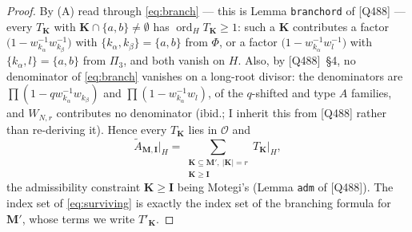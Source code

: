 \documentclass[11pt]{article}
\theoremstyle{plain}
\theoremstyle{definition}
\theoremstyle{remark}
\theoremstyle{plain}
\newcommand{\bI}{\mathbf{I}}
\newcommand{\bM}{\mathbf{M}}
\newcommand{\bK}{\mathbf{K}}
\newcommand{\At}{\widetilde{A}}
\newcommand{\ord}{\operatorname{ord}}
\begin{document}
\begin{proof}
By (A) read through \eqref{eq:branch} --- this is Lemma \texttt{branchord} of
[Q488] --- every $T_{\bK}$ with $\bK\cap\{a,b\}\ne\emptyset$ has
$\ord_HT_{\bK}\ge1$: such a $\bK$ contributes a factor
$\bigl(1-w_{k_\alpha}^{-1}w_{k_\beta}^{-1}\bigr)$ with $\{k_\alpha,k_\beta\}
=\{a,b\}$ from $\Phi$, or a factor $\bigl(1-w_{k_\alpha}^{-1}w_{l}^{-1}\bigr)$
with $\{k_\alpha,l\}=\{a,b\}$ from $\Pi_3$, and both vanish on $H$.  Also, by
[Q488]~\S4, no denominator of \eqref{eq:branch} vanishes on a long-root
divisor: the denominators are
$\prod(1-qw_{k_\alpha}^{-1}w_{k_\beta})$ and
$\prod(1-w_{k_\alpha}^{-1}w_{l})$, of the $q$-shifted and type $A$ families,
and $W_{N,r}$ contributes no denominator (ibid.; I inherit this from [Q488]
rather than re-deriving it).  Hence every $T_{\bK}$ lies in $\mathcal{O}$ and
\begin{equation}
\At_{\bM,\bI}\big|_H=\sum_{\substack{\bK\subseteq\bM',\ |\bK|=r\\ \bK\ge\bI}}
T_{\bK}\big|_H ,
\label{eq:surviving}
\end{equation}
the admissibility constraint $\bK\ge\bI$ being Motegi's (Lemma
\texttt{adm} of [Q488]).  The index set of \eqref{eq:surviving} is exactly the
index set of the branching formula for $\bM'$, whose terms we write $T'_{\bK}$.


\end{proof}
\end{document}
